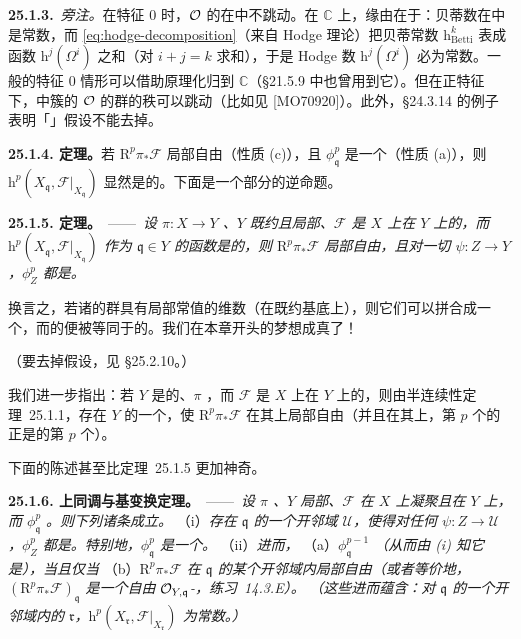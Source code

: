 \textbf{25.1.3.}\ \emph{旁注。}\quad 在特征 $0$ 时，$\mathcal{O}$ 的\trCohomology{}在\trSmooth{}\trFamily{}中不跳动。在 $\mathbb{C}$ 上，缘由在于：贝蒂数在\trConnected{}\trFamily{}中是常数，而 \eqref{eq:hodge-decomposition}（来自 Hodge 理论）把贝蒂常数 $\mathrm{h}^k_{\mathrm{Betti}}$ 表成\trUpperSemicontinuous{}函数 $\mathrm{h}^j(\Omega^i)$ 之和（对 $i+j=k$ 求和），于是 Hodge 数 $\mathrm{h}^j(\Omega^i)$ 必为常数。一般的特征 $0$ 情形可以借助\trLefschetz{}原理化归到 $\mathbb{C}$（\S21.5.9 中也曾用到它）。但在正特征下，\trSmooth{}\trFamily{}中簇的 $\mathcal{O}$ 的\trCohomology{}群的秩可以跳动（比如见 [MO70920]）。此外，\S24.3.14 的例子表明「\trSmoothness」假设不能去掉。

\textbf{25.1.4. \trGrauert{}定理。}\quad 若 $\mathrm{R}^p\pi_*\mathscr{F}$ 局部自由（性质 (c)），且 $\phi^p_{\mathfrak{q}}$ 是一个\trIsomorphism（性质 (a)），则 $\mathrm{h}^p(X_{\mathfrak{q}},\mathscr{F}|_{X_{\mathfrak{q}}})$ 显然是\trLocallyConstant{}的。下面是一个部分的逆命题。

\textbf{25.1.5. \trGrauert{}定理。}\ ——\ \emph{设 $\pi\colon X\to Y$ \trProper、$Y$ 既约且局部\trNoether、$\mathscr{F}$ 是 $X$ 上在 $Y$ 上\trFlat{}的\trCoherentSheaf，而 $\mathrm{h}^p(X_{\mathfrak{q}},\mathscr{F}|_{X_{\mathfrak{q}}})$ 作为 $\mathfrak{q}\in Y$ 的函数是\trLocallyConstant{}的，则 $\mathrm{R}^p\pi_*\mathscr{F}$ 局部自由，且对一切 $\psi\colon Z\to Y$，$\phi^p_Z$ 都是\trIsomorphism。}

换言之，若诸\trFiber{}的\trCohomology{}群具有局部常值的维数（在既约基底上），则它们可以拼合成一个\trVectorBundle，而\trPushforward{}的\trFiber{}便被等同于\trFiber{}的\trCohomology。我们在本章开头的梦想成真了！

（要去掉\trNoether{}假设，见 \S25.2.10。）

我们进一步指出：若 $Y$ 是\trIntegral{}的、$\pi$ \trProper，而 $\mathscr{F}$ 是 $X$ 上在 $Y$ 上\trFlat{}的\trCoherentSheaf，则由\mbox{半连续性定理~25.1.1}，存在 $Y$ 的一个\trDense\trOpenSubset，使 $\mathrm{R}^p\pi_*\mathscr{F}$ 在其上局部自由（并且在其上，第 $p$ 个\trHigherPushforward{}的\trFiber{}正是\trFiber{}的第 $p$ 个\trCohomology）。

下面的陈述甚至比\mbox{\trGrauert{}定理~25.1.5} 更加神奇。

\textbf{25.1.6. 上同调与基变换定理。}\ ——\ \emph{设 $\pi$ \trProper、$Y$ 局部\trNoether、$\mathscr{F}$ 在 $X$ 上凝聚且在 $Y$ 上\trFlat，而 $\phi^p_{\mathfrak{q}}$ \trSurjectiveMap。则下列诸条成立。}
（i）\emph{存在 $\mathfrak{q}$ 的一个开邻域 $\mathscr{U}$，使得对任何 $\psi\colon Z\to\mathscr{U}$，$\phi^p_Z$ 都是\trIsomorphism。特别地，$\phi^p_{\mathfrak{q}}$ 是一个\trIsomorphism。}
（ii）\emph{进而，}
（a）\emph{$\phi^{p-1}_{\mathfrak{q}}$ \trSurjectiveMap（从而由 (i) 知它是\trIsomorphism），当且仅当}
（b）\emph{$\mathrm{R}^p\pi_*\mathscr{F}$ 在 $\mathfrak{q}$ 的某个开邻域内局部自由（或者等价地，$(\mathrm{R}^p\pi_*\mathscr{F})_{\mathfrak{q}}$ 是一个自由 $\mathcal{O}_{Y,\mathfrak{q}}$-\trModule{}，\mbox{练习~14.3.E}）。}
\emph{（这些进而蕴含：对 $\mathfrak{q}$ 的一个开邻域内的 $\mathfrak{r}$，$\mathrm{h}^p(X_{\mathfrak{r}},\mathscr{F}|_{X_{\mathfrak{r}}})$ 为常数。）}

